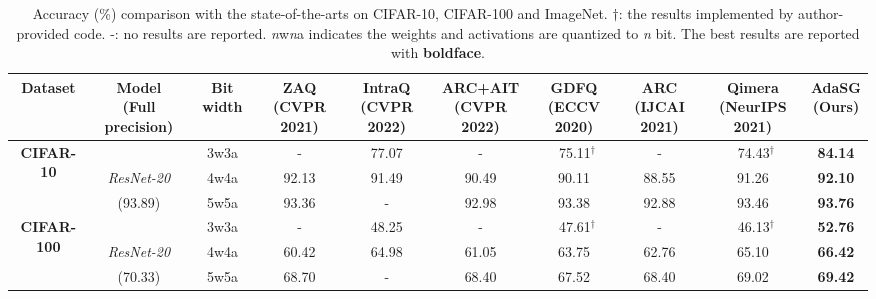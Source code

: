 \begin{table}
\setlength{\abovecaptionskip}{0.02cm}
\caption{Accuracy (\%) comparison with the state-of-the-arts on CIFAR-10, CIFAR-100 and ImageNet. $\dag$: the results implemented by author-provided code. -: no results are reported. \emph{n}w\emph{n}a indicates the weights and activations are quantized to \emph{n} bit. The best results are reported with \textbf{boldface}.}
\label{sota}
\centering
\scriptsize
\begin{tabular}{c|cc|c|  c| c| ccc  |c}
\toprule
\textbf{Dataset} &\tabincell{c}{\textbf{Model} \\ (Full precision)}     &\textbf{Bit width}  &\tabincell{c}{\textbf{ZAQ} \\ (CVPR 2021)} &\tabincell{c}{\textbf{IntraQ}  \\ (CVPR 2022)} &\tabincell{c}{\textbf{ARC+AIT}  \\ (CVPR 2022)}  &\tabincell{c}{\textbf{GDFQ} \\ (ECCV 2020)}    &\tabincell{c}{\textbf{ARC} \\ (IJCAI 2021)}    &\tabincell{c}{\textbf{Qimera} \\ (NeurIPS 2021)}    &\tabincell{c}{\textbf{AdaSG} \\ \textbf{(Ours)}}   \\
\bottomrule
\toprule
\multirow{3}{*}{\textbf{CIFAR-10}}
&                       &3w3a     &-      &77.07 &-  &\ 75.11$^{\dag}$     &-     &\ 74.43$^{\dag}$            &\textbf{84.14}   \\
&\emph{ResNet-20}      &\cellcolor{mygreen}4w4a     &\cellcolor{mygreen}92.13 &\cellcolor{mygreen}91.49 &\cellcolor{mygreen}90.49     &\cellcolor{mygreen}90.11     &\cellcolor{mygreen}88.55     &\cellcolor{mygreen}91.26    &\cellcolor{mygreen}\textbf{92.10}  \\
&(93.89)            &5w5a     &93.36 &-  &92.98   &93.38     &92.88     &93.46   &\textbf{93.76}   \\
\bottomrule
\toprule
\multirow{3}{*}{\textbf{CIFAR-100}}
&                       &3w3a     &-    &48.25 &-  &\ 47.61$^{\dag}$      &-    &\ 46.13$^{\dag}$           &\textbf{52.76}   \\
&\emph{ResNet-20}      &\cellcolor{mygreen}4w4a     &\cellcolor{mygreen}60.42 &\cellcolor{mygreen}64.98 &\cellcolor{mygreen}61.05    &\cellcolor{mygreen}63.75      &\cellcolor{mygreen}62.76    &\cellcolor{mygreen}65.10   &\cellcolor{mygreen}\textbf{66.42}  \\
&(70.33)            &5w5a     &68.70 &-  &68.40   &67.52      &68.40    &69.02   &\textbf{69.42}   \\


\end{tabular}
\end{table}
